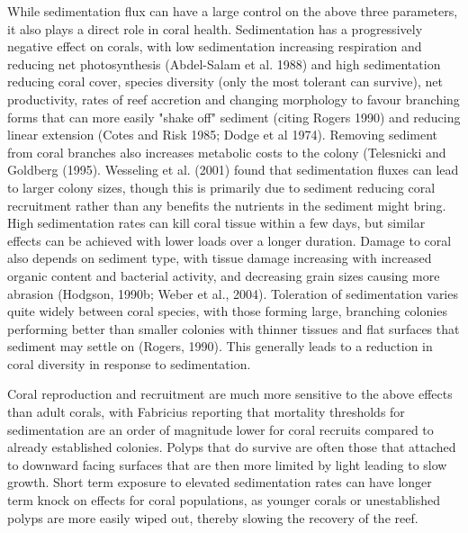 \documentclass[11pt,a4paper]{article}
\begin{document}
While sedimentation flux can have a large control on the above three parameters, it also plays a direct role in coral health.
Sedimentation has a progressively negative effect on corals, with low sedimentation increasing respiration and reducing net photosynthesis (Abdel-Salam et al. 1988) and high sedimentation reducing coral cover, species diversity (only the most tolerant can survive), net productivity, rates of reef accretion and changing morphology to favour branching forms that can more easily "shake off" sediment (citing Rogers 1990) and reducing linear extension (Cotes and Risk 1985; Dodge et al 1974).
 Removing sediment from coral branches also increases metabolic costs to the colony (Telesnicki and Goldberg (1995).
Wesseling et al. (2001) found that sedimentation fluxes can lead to larger colony sizes, though this is primarily due to sediment reducing coral recruitment rather than any benefits the nutrients in the sediment might bring.  
High sedimentation rates can kill coral tissue within a few days, but similar effects can be achieved with lower loads over a longer duration. Damage to coral also depends on sediment type, with tissue damage increasing with increased organic content and bacterial activity, and decreasing grain sizes causing more abrasion (Hodgson, 1990b; Weber et al., 2004). 
Toleration of sedimentation varies quite widely between coral species, with those forming large, branching colonies performing better than smaller colonies with thinner tissues and flat surfaces that sediment may settle on (Rogers, 1990). This generally leads to a reduction in coral diversity in response to sedimentation.


Coral reproduction and recruitment are much more sensitive to the above effects than adult corals, with Fabricius reporting that mortality thresholds for sedimentation are an order of magnitude lower for coral recruits compared to already established colonies.
 Polyps that do survive are often those that attached to downward facing surfaces that are then more limited by light leading to slow growth.
  Short term exposure to elevated sedimentation rates can have longer term knock on effects for coral populations, as younger corals or unestablished polyps are more easily wiped out, thereby slowing the recovery of the reef.
\end{document}
